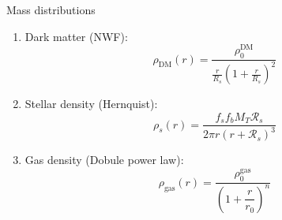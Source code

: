 \documentclass[handout]{beamer}
\newcommand{\sm}[0]{$M_\odot$}
\begin{document}
\begin{frame}{Mass distributions}
	\begin{enumerate}
		\item Dark matter (NWF):
		\begin{equation}\label{eq: dmdensity}
		\rho_\text{DM}(r) = \dfrac{\rho_0^\text{DM}}{\frac{r}{R_s}\left(1 + \frac{r}{R_s}\right)^2}
		\end{equation}
		\item Stellar density (Hernquist):
		\begin{equation}
		\rho_s(r) = \dfrac{f_sf_bM_T \mathcal{R}_s}{2\pi r(r + \mathcal{R}_s)^3}
		\end{equation}
		\item Gas density (Dobule power law):
		\begin{equation}\label{eq: rdensity}
		\rho_\text{gas}(r) = \dfrac{\rho_0^\text{gas}}{\left(1 + \dfrac{r}{r_0}\right)^n}
		\end{equation}
	\end{enumerate}
\end{frame}

\end{document}
